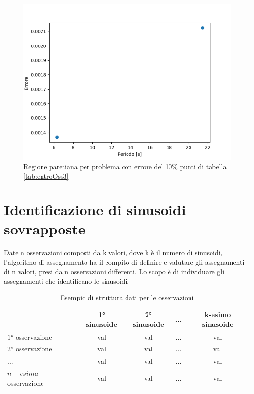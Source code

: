 \documentclass[a4paper,12pt]{report}
\begin{document}
\begin{itemize}
        \begin{figure}[H]
          \centering
          \includegraphics[scale=0.70]{img/entroOss/puls02/err10.png}
          \caption{Regione paretiana per problema con errore del 10\% punti di tabella \ref{tab:entroOss3}}
          \label{fig:entroOss_02_std_10err}
        \end{figure}

\end{itemize}





\chapter{Identificazione di sinusoidi sovrapposte}
Date n osservazioni composti da k valori, dove k è il numero di sinusoidi, l'algoritmo di assegnamento ha il compito di definire e valutare gli assegnamenti di n valori, presi da n osservazioni differenti. Lo scopo è di individuare gli assegnamenti che identificano le sinusoidi.

\begin{table}[H]
  \caption{Esempio di struttura dati per le osservazioni}
  \label{tab:osservazioni}
  \center
    \begin{tabular}{lcccc}
      \toprule
      {} & {\ang{1} sinusoide} & {\ang{2} sinusoide} & {...} & {k-esimo sinusoide}\\
      \midrule
      $\ang{1}$ osservazione & val & val & ... & val \\
      $\ang{2}$ osservazione & val & val & ... & val  \\
      ...                    & val & val & ... & val \\
      $n-esima$ osservazione & val & val & ... & val \\
      \bottomrule
    \end{tabular}
\end{table}
\end{document}
